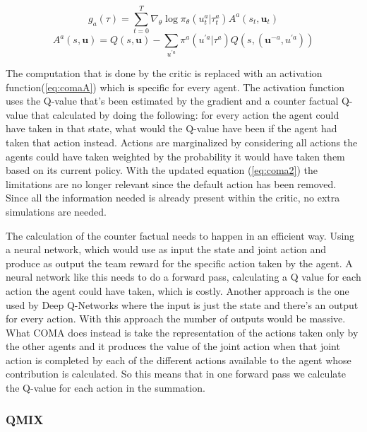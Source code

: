 \begin{equation} \label{eq:coma2}
g_{a}(\tau)=\sum_{t=0}^{T} \nabla_{\theta} \log \pi_{\theta}\left(u_{t}^{a} | \tau_{t}^{a}\right) A^{a}\left(s_{t}, \mathbf{u}_{t}\right)
\end{equation}
\begin{equation} \label{eq:comaA}
A^{a}(s, \mathbf{u})=Q(s, \mathbf{u})-\sum_{u^{\prime a}} \pi^{a}\left(u^{\prime a} | \tau^{a}\right) Q\left(s,\left(\mathbf{u}^{-a}, u^{\prime a}\right)\right)
\end{equation}

The computation that is done by the critic is replaced with an activation function(\ref{eq:comaA}) which is specific for every agent. The activation function uses the Q-value that's been estimated by the gradient and a counter factual Q-value that calculated by doing the following: for every action the agent could have taken in that state, what would the Q-value have been if the agent had taken that action instead. Actions are marginalized by considering all actions the agents could have taken weighted by the probability it would have taken them based on its current policy. With the updated equation (\ref{eq:coma2}) the limitations are no longer relevant since the default action has been removed. Since all the information needed is already present within the critic, no extra simulations are needed. 

The calculation of the counter factual needs to happen in an efficient way. Using a neural network, which would use as input the state and joint action and produce as output the team reward for the specific action taken by the agent. A neural network like this needs to do a forward pass, calculating a Q value for each action the agent could have taken, which is costly. Another approach is the one used by Deep Q-Networks where the input is just the state and there's an output for every action. With this approach the number of outputs would be massive. What COMA does instead is take the representation of the actions taken only by the other agents and it produces the value of the joint action when that joint action is completed by each of the different actions available to the agent whose contribution is calculated. So this means that in one forward pass we calculate the Q-value for each action in the summation.

\subsubsection{QMIX}

